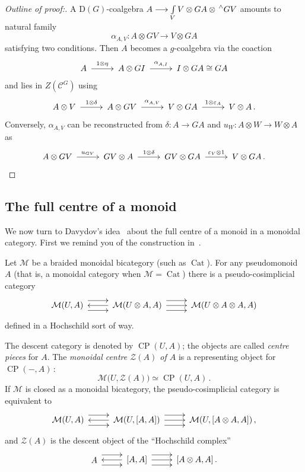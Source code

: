 \documentclass[a4paper,12pt]{article}
\makeatletter
\theoremstyle{definition}
\theoremstyle{fact}
\theoremstyle{genquest}
\theoremstyle{step}
\newcommand{\Cat}{\operatorname{Cat}}
\newcommand{\catC}{\mathcal{C}}
\newcommand{\CP}{\operatorname{CP}}
\newcommand{\Drin}{\mathrm{D}}
\newcommand{\funcM}{\mathcal{M}}
\newcommand{\cntrZ}{\mathcal{Z}}%
\newcommand{\longto}{\longrightarrow}
\newcommand{\ldual}[1]{\mathord{{\let\nolimits\relax\sideset{^\wedge}{}{#1}}}}
\newcommand{\xylongto}[2][2pt]{{\UseTips{}\xymatrix @C+#1{ \ar[r]^{#2}&}}}
\makeatother
\begin{document}
\begin{proof}[Outline of proof:] %
A $\Drin (G)$-coalgebra $ A\longto \int\limits_V V \otimes GA \otimes \ldual{G}V$ amounts to natural family
\[
\alpha^{}_{A,V} : A \otimes GV \longto V \otimes GA
\]
satisfying two conditions. Then $A$ becomes a $g$-coalgebra via the coaction
\[
A \xylongto{1\otimes \eta} %
A \otimes GI \xylongto{\alpha^{}_{A,I}} %
 I \otimes GA \cong GA
\]
and lies in $Z(\catC^G)$ using
\[
A \otimes V \xylongto{1\otimes \delta} %
A \otimes GV \xylongto{\alpha^{}_{A,V}} %
V \otimes GA \xylongto{1\otimes \varepsilon_A} %
V \otimes A\,.
\]
Conversely, $\alpha^{}_{A,V}$ can be reconstructed from $\delta : A \longto GA$ and $u_W : A \otimes W \longto W \otimes A$ as 
\[
A\otimes GV \xylongto{u_{GV}} %
GV \otimes A \xylongto{1\otimes \delta} %
GV \otimes GA \xylongto{\varepsilon_V\otimes 1} %
 V \otimes GA\,.  \qedhere %
\]  
\end{proof}
 
\subsection{The full centre of a monoid}

We now turn to Davydov's idea~\cite{Davydov2010} about the full centre of a monoid in a monoidal category.   
First we remind you of the construction in~\cite{MCL}.

Let $\funcM$ be a braided monoidal bicategory (such as $\Cat$).  
For any pseudomonoid $A$ (that is, a monoidal category when $\funcM=\Cat$) there is a pseudo-cosimplicial category
\[ 
 \UseTips{}\entrymodifiers={+<4mm>!C}\xymatrix{ 
 \funcM(U,A) \ar @<6pt>[r]  \ar @<-6pt>[r]
& \funcM(U\otimes A,A) \ar[l]  \ar @<6pt>[r]  \ar[r]   \ar @<-6pt>[r]
& \funcM(U\otimes A\otimes A,A) }
\]
defined in a Hochschild sort of way.
 
The descent category is denoted by $\CP(U,A)$; the objects are called \emph{centre pieces} for $A$.    
The \emph{monoidal centre $\cntrZ(A)$ of $A$} is a representing object for $\CP(-,A)\,$:
\[
\funcM\bigl(U, \cntrZ(A)\bigr) \simeq \CP(U,A)\,.
\]
If $\funcM$ is closed as a monoidal bicategory, the pseudo-cosimplicial category is equivalent to
\[
 \UseTips{}\entrymodifiers={+<4mm>!C}\xymatrix{ 
\funcM(U,A)  \ar @<6pt>[r]  \ar @<-6pt>[r]
& \funcM(U,[A,A]) \ar[l]  \ar @<6pt>[r]  \ar[r]   \ar @<-6pt>[r]
& \funcM(U,[A \otimes A,A])\,, }
\]
and $\cntrZ(A)$ is the descent object of the ``Hochschild complex''
\[ 
\UseTips{}\entrymodifiers={+<4mm>!C}\xymatrix{ 
A  \ar @<6pt>[r]  \ar @<-6pt>[r]
& [A,A] \ar[l]  \ar @<6pt>[r]  \ar[r]   \ar @<-6pt>[r]
& [A \otimes A,A]\,. }
\]
 
\end{document}
